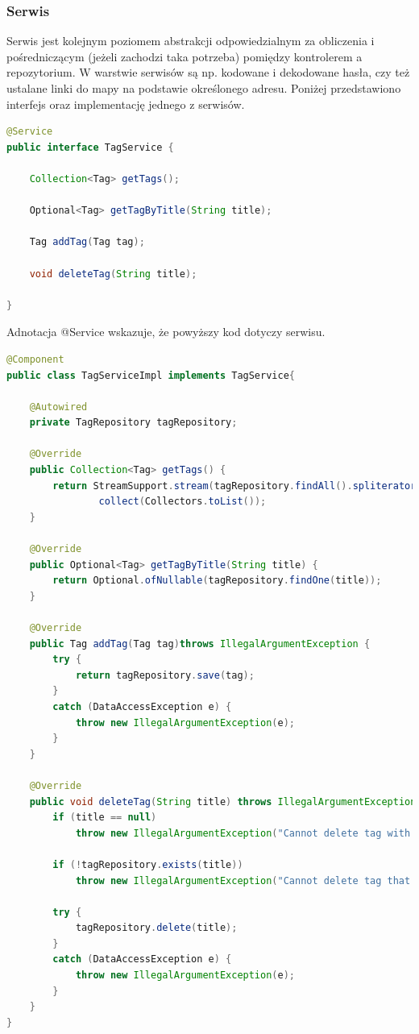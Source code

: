 \documentclass{report}
\begin{document}
			
			\subsubsection{Serwis}
			
Serwis jest kolejnym poziomem abstrakcji odpowiedzialnym za obliczenia i pośredniczącym (jeżeli zachodzi taka potrzeba) pomiędzy kontrolerem a repozytorium. W warstwie serwisów są np. kodowane i dekodowane hasła, czy też ustalane linki do mapy na podstawie określonego adresu. Poniżej przedstawiono interfejs oraz implementację jednego z serwisów.			

\begin{lstlisting}[language=Java, breaklines]
@Service
public interface TagService {

    Collection<Tag> getTags();

    Optional<Tag> getTagByTitle(String title);

    Tag addTag(Tag tag);

    void deleteTag(String title);

}
\end{lstlisting}

Adnotacja @Service wskazuje, że powyższy kod dotyczy serwisu.

\begin{lstlisting}[language=Java, breaklines]
@Component
public class TagServiceImpl implements TagService{

    @Autowired
    private TagRepository tagRepository;

    @Override
    public Collection<Tag> getTags() {
        return StreamSupport.stream(tagRepository.findAll().spliterator(), false).
                collect(Collectors.toList());
    }

    @Override
    public Optional<Tag> getTagByTitle(String title) {
        return Optional.ofNullable(tagRepository.findOne(title));
    }

    @Override
    public Tag addTag(Tag tag)throws IllegalArgumentException {
        try {
            return tagRepository.save(tag);
        }
        catch (DataAccessException e) {
            throw new IllegalArgumentException(e);
        }
    }

    @Override
    public void deleteTag(String title) throws IllegalArgumentException {
        if (title == null)
            throw new IllegalArgumentException("Cannot delete tag with unspecified title");

        if (!tagRepository.exists(title))
            throw new IllegalArgumentException("Cannot delete tag that does not exist");

        try {
            tagRepository.delete(title);
        }
        catch (DataAccessException e) {
            throw new IllegalArgumentException(e);
        }
    }
}
\end{lstlisting}
\end{document}
